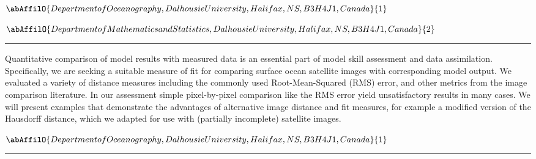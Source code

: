 \begin{center}
   \vspace{2 mm} \begin{center}
    \vspace{2 mm}\begin{center}
  
  $\abAffilO{Department of Oceanography, Dalhousie University, Halifax, NS, B3H 4J1, Canada}{1}$

  
  $\abAffilO{Department of Mathematics and Statistics, Dalhousie University, Halifax, NS, B3H 4J1, Canada}{2}$

  \end{center}
  \vspace{2 mm}
  \end{center}\end{center}
  \begin{center}\rule{0.70\linewidth}{0.5 pt}\end{center}

\noindent Quantitative comparison of model results with measured data is an essential part of model skill assessment and data assimilation. Specifically, we are seeking a suitable measure of fit for comparing surface ocean satellite images with corresponding model output. We evaluated a variety of distance measures including the commonly used Root-Mean-Squared (RMS) error, and other metrics from the image comparison literature. In our assessment simple pixel-by-pixel comparison like the RMS error yield unsatisfactory results in many cases. We will present examples that demonstrate the advantages of alternative image distance and fit measures, for example a modified version of the Hausdorff distance, which we adapted for use with (partially incomplete) satellite images.

\begin{center}
   \vspace{2 mm} \begin{center}
    \vspace{2 mm}\begin{center}
  
  $\abAffilO{Department of Oceanography, Dalhousie University, Halifax, NS, B3H 4J1, Canada}{1}$

  \end{center}
  \vspace{2 mm}
  \end{center}\end{center}
  \begin{center}\rule{0.70\linewidth}{0.5 pt}\end{center}

